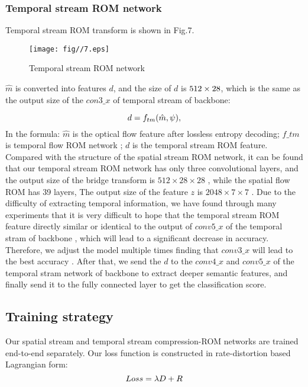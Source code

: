 \documentclass[a4paper]{cas-sc}
\begin{document}
\subsubsection{Temporal stream ROM network}
Temporal stream ROM transform is shown in Fig.7.

\begin{figure}[ht]
	\centering
		\texttt{[image: fig//7.eps]}
	  \caption{Temporal stream ROM network}\label{fig.7}
\end{figure}

$\hat{m}$ is converted into features $d$, and the size of $d$ is $512\time28\times28$, 
which is the same as the output  size of the $con3\_x$ of temporal stream of backbone:

\begin{equation}
  \centering
    d=f_{tm}(\hat{m},\psi),
\end{equation}
In the formula: 
$\hat{m}$ is the optical flow feature after lossless entropy decoding; 
$f\_tm$ is temporal flow ROM network ;
$d$ is the temporal stream ROM feature.\\

Compared with the structure of the spatial stream ROM network, 
it can be found that our temporal stream ROM network has only three convolutional layers, 
and the output size of the bridge transform  is $512\times28\times28$ ,
while the spatial flow ROM  has 39 layers, 
The output size of the feature $z$ is $2048\times7\times7$ . 
Due to the difficulty of extracting temporal information, 
we have found through many experiments that it is very difficult to hope that the temporal stream ROM feature 
directly similar or identical to the output of $conv5\_x$ of  the temporal stram of backbone  ,
which will lead to a significant decrease in accuracy. 
Therefore, we adjust the model multiple times finding  that $conv3\_x$ will lead to
 the best accuracy . 
After that, we send the $d$ to the $conv4\_x$ and $conv5\_x$ of the temporal stram network of backbone to extract deeper semantic features,
and finally send it to the fully connected layer to get the classification score.\\

\subsection{Training strategy}
Our spatial stream and temporal stream compression-ROM networks are trained end-to-end separately. 
Our loss function is constructed in rate-distortion based Lagrangian form:
\begin{equation}
  \centering   
    Loss=\lambda{D}+R
\end{equation}
\end{document}
